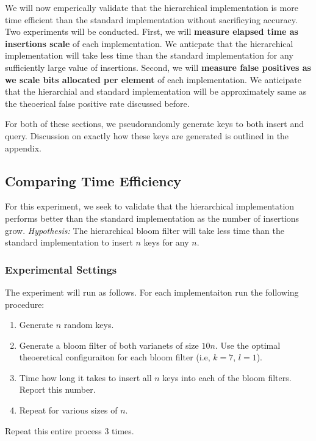 We will now emperically validate that the hierarchical implementation is more time efficient than the standard implementation without sacrificying accuracy.
Two experiments will be conducted.
First, we will \textbf{measure elapsed time as insertions scale} of each implementation.
We anticpate that the hierarchical implementation will take less time than the standard implementation for any sufficiently large value of insertions.
Second, we will \textbf{measure false positives as we scale bits allocated per element} of each implementation.
We anticipate that the hierarchial and standard implementation will be approximately same as the theoerical false positive rate discussed before.

For both of these sections, we pseudorandomly generate keys to both insert and query.
Discussion on exactly how these keys are generated is outlined in the appendix.


\subsection{Comparing Time Efficiency}

For this experiment, we seek to validate that the hierarchical implementation performs better than the standard implementation as the number of insertions grow.
\textit{Hypothesis:} The hierarchical bloom filter will take less time than the standard implementation to insert $n$ keys for any $n$.

\subsubsection{Experimental Settings}

The experiment will run as follows. For each implementaiton run the following procedure:
\begin{enumerate}
    \item Generate $n$ random keys.
    \item Generate a bloom filter of both varianets of size $10n$. Use the optimal theoeretical configuraiton for each bloom filter (i.e, $k=7$, $l=1$).
    \item Time how long it takes to insert all $n$ keys into each of the bloom filters. Report this number.
    \item Repeat for various sizes of $n$.
\end{enumerate}
Repeat this entire process $3$ times.

